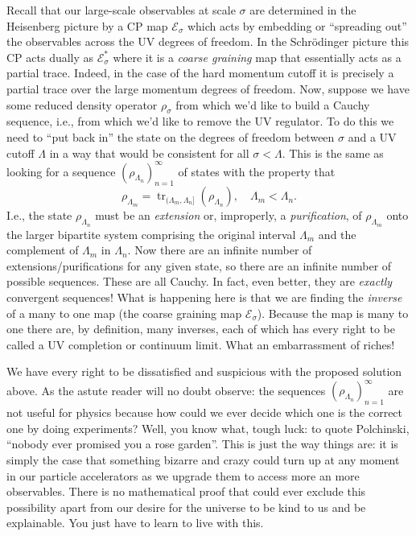 \documentclass[11pt]{amsart}
\DeclareMathOperator{\tr}{tr}
\theoremstyle{plain}%
\theoremstyle{definition}
\theoremstyle{remark}
\begin{document}
Recall that our large-scale observables at scale $\sigma$ are determined in the Heisenberg picture by a CP map $\mathcal{E}_\sigma$ which acts by embedding or ``spreading out'' the observables across the UV degrees of freedom. In the Schr\"odinger picture this CP acts dually as $\mathcal{E}_\sigma^*$ where it is a \emph{coarse graining} map that essentially acts as a partial trace. Indeed, in the case of the hard momentum cutoff it is precisely a partial trace over the large momentum degrees of freedom.  Now, suppose we have some reduced density operator $\rho_\sigma$ from which we'd like to build a Cauchy sequence, i.e., from which we'd like to remove the UV regulator. To do this we need to ``put back in'' the state on the degrees of freedom between $\sigma$ and a UV cutoff $\Lambda$ in a way that would be consistent for all $\sigma < \Lambda$. This is the same as looking for a sequence $(\rho_{\Lambda_n})_{n=1}^\infty$ of states with the property that
\begin{equation}
\rho_{\Lambda_m} = \tr_{(\Lambda_m,\Lambda_n]}(\rho_{\Lambda_n}), \quad \Lambda_m < \Lambda_n.
\end{equation}
I.e., the state $\rho_{\Lambda_n}$ must be an \emph{extension} or, improperly, a \emph{purification}, of $\rho_{\Lambda_m}$ onto the larger bipartite system comprising the original interval $\Lambda_m$ and the complement of $\Lambda_m$ in $\Lambda_n$. Now there are an infinite number of extensions/purifications for any given state, so there are an infinite number of possible sequences. These are all Cauchy. In fact, even better, they are \emph{exactly} convergent sequences! 
What is happening here is that we are finding the \emph{inverse} of a many to one map (the coarse graining map $\mathcal{E}_\sigma$). Because the map is many to one there are, by definition, many inverses, each of which has every right to be called a UV completion or continuum limit. What an embarrassment of riches! 

We have every right to be dissatisfied and suspicious with the proposed solution above. As the astute reader will no doubt observe: the sequences $(\rho_{\Lambda_n})_{n=1}^\infty$ are not useful for physics because how could we ever decide which one is the correct one by doing experiments? Well, you know what, tough luck: to quote Polchinski, ``nobody ever promised you a rose garden''. This is just the way things are: it is simply the case that something bizarre and crazy could turn up at any moment in our particle accelerators as we upgrade them to access more an more observables. There is no mathematical proof that could ever exclude this possibility apart from our desire for the universe to be kind to us and be explainable. You just have to learn to live with this. 
\end{document}
